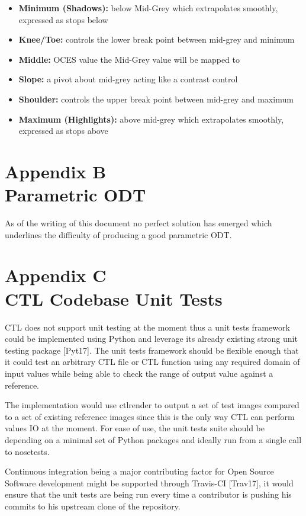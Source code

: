 \documentclass[conference]{IEEEtran}
\begin{document}
\begin{itemize}
\item \textbf{Minimum (Shadows):} below Mid-Grey which extrapolates smoothly, expressed as stops below
\item \textbf{Knee/Toe:} controls the lower break point between mid-grey and minimum
\item \textbf{Middle:} OCES value the Mid-Grey value will be mapped to
\item \textbf{Slope:} a pivot about mid-grey acting like a contrast control
\item \textbf{Shoulder:} controls the upper break point between mid-grey and maximum
\item \textbf{Maximum (Highlights):} above mid-grey which extrapolates smoothly, expressed as stops above
\end{itemize}

\section*{Appendix B\\ \small Parametric ODT}
As of the writing of this document no perfect solution has emerged which underlines the difficulty of producing a good parametric ODT.

\section*{Appendix C\\ \small CTL Codebase Unit Tests}
CTL does not support unit testing at the moment thus a unit tests framework could be implemented using Python and leverage its already existing strong unit testing package [Pyt17]. The unit tests framework should be flexible enough that it could test an arbitrary CTL file or CTL function using any required domain of input values while being able to check the range of output value against a reference.

The implementation would use ctlrender to output a set of test images compared to a set of existing reference images since this is the only way CTL can perform values IO at the moment. For ease of use, the unit tests suite should be depending on a minimal set of Python packages and ideally run from a single call to nosetests.

Continuous integration being a major contributing factor for Open Source Software development might be supported through Travis-CI [Trav17], it would ensure that the unit tests are being run every time a contributor is pushing his commits to his upstream clone of the repository.
\end{document}
